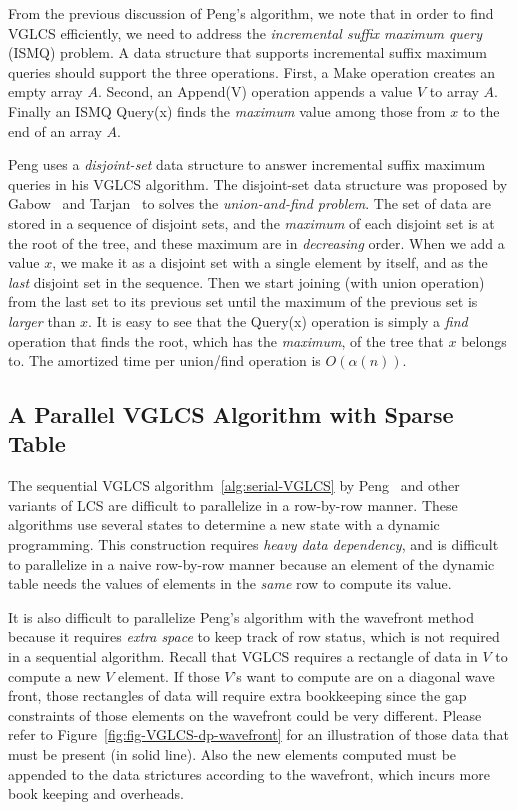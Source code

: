 From the previous discussion of Peng's algorithm, we note that in
order to find VGLCS efficiently, we need to address the {\em
  incremental suffix maximum query} (ISMQ) problem.  A data structure
that supports incremental suffix maximum queries should support the
three operations.  First, a {\sc Make} operation creates an empty
array $A$. Second, an {\sc Append(V)} operation appends a value $V$ to
array $A$. Finally an ISMQ {\sc Query(x)} finds the {\em maximum}
value among those from $x$ to the end of an array $A$.

Peng uses a {\em disjoint-set} data structure to answer incremental
suffix maximum queries in his VGLCS algorithm.  The disjoint-set data
structure was proposed by Gabow~\cite{Gabow1983ALA} and
Tarjan~\cite{Tarjan1975EfficiencyOA} to solves the {\em union-and-find
  problem}.  The set of data are stored in a sequence of disjoint
sets, and the {\em maximum} of each disjoint set is at the root of the
tree, and these maximum are in {\em decreasing} order.  When we add a
value $x$, we make it as a disjoint set with a single element by
itself, and as the {\em last} disjoint set in the sequence.  Then we
start joining (with union operation) from the last set to its previous
set until the maximum of the previous set is {\em larger} than $x$.
It is easy to see that the {\sc Query(x)} operation is simply a {\em
  find} operation that finds the root, which has the {\em maximum}, of
the tree that $x$ belongs to.  The amortized time per union/find
operation is $O(\alpha(n))$.

\subsection{A Parallel VGLCS Algorithm with Sparse Table}

The sequential VGLCS algorithm~\ref{alg:serial-VGLCS} by
Peng~\cite{Peng2011TheLC} and other variants of LCS are difficult to
parallelize in a row-by-row manner.  These algorithms use several
states to determine a new state with a dynamic programming.  This
construction requires {\em heavy data dependency}, and is difficult to
parallelize in a naive row-by-row manner because an element of the
dynamic table needs the values of elements in the {\em same} row to
compute its value.

It is also difficult to parallelize Peng's algorithm with the
wavefront method because it requires {\em extra space} to keep track
of row status, which is not required in a sequential algorithm.
Recall that VGLCS requires a rectangle of data in $V$ to compute a new
$V$ element.  If those $V$'s want to compute are on a diagonal wave
front, those rectangles of data will require extra bookkeeping since
the gap constraints of those elements on the wavefront could be very
different.  Please refer to Figure~\ref{fig:fig-VGLCS-dp-wavefront}
for an illustration of those data that must be present (in solid
line).  Also the new elements computed must be appended to the data
strictures according to the wavefront, which incurs more book keeping
and overheads.

